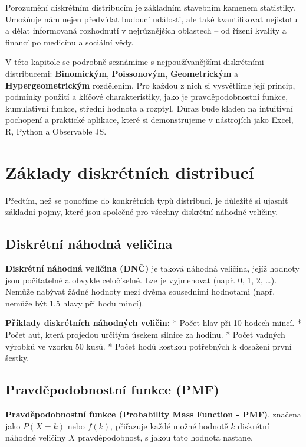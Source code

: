 \documentclass[
  czech,
  11pt,
  letterpaper,
  DIV=11,
  numbers=noendperiod]{scrreprt}
\begin{document}
Porozumění diskrétním distribucím je základním stavebním kamenem
statistiky. Umožňuje nám nejen předvídat budoucí události, ale také
kvantifikovat nejistotu a dělat informovaná rozhodnutí v nejrůznějších
oblastech -- od řízení kvality a financí po medicínu a sociální vědy.

V této kapitole se podrobně seznámíme s nejpoužívanějšími diskrétními
distribucemi: \textbf{Binomickým}, \textbf{Poissonovým},
\textbf{Geometrickým} a \textbf{Hypergeometrickým} rozdělením. Pro
každou z nich si vysvětlíme její princip, podmínky použití a klíčové
charakteristiky, jako je pravděpodobnostní funkce, kumulativní funkce,
střední hodnota a rozptyl. Důraz bude kladen na intuitivní pochopení a
praktické aplikace, které si demonstrujeme v nástrojích jako Excel, R,
Python a Observable JS.

\section{Základy diskrétních
distribucí}\label{zuxe1klady-diskruxe9tnuxedch-distribucuxed}

Předtím, než se ponoříme do konkrétních typů distribucí, je důležité si
ujasnit základní pojmy, které jsou společné pro všechny diskrétní
náhodné veličiny.

\subsection{Diskrétní náhodná
veličina}\label{diskruxe9tnuxed-nuxe1hodnuxe1-veliux10dina}

{\textbf{Diskrétní náhodná veličina (DNČ)}} je taková náhodná veličina,
jejíž hodnoty jsou počitatelné a obvykle celočíselné. Lze je vyjmenovat
(např. 0, 1, 2, \ldots). Nemůže nabývat žádné hodnoty mezi dvěma
sousedními hodnotami (např. nemůže být 1.5 hlavy při hodu mincí).

\textbf{Příklady diskrétních náhodných veličin:} * Počet hlav při 10
hodech mincí. * Počet aut, která projedou určitým úsekem silnice za
hodinu. * Počet vadných výrobků ve vzorku 50 kusů. * Počet hodů kostkou
potřebných k dosažení první šestky.

\subsection{Pravděpodobnostní funkce
(PMF)}\label{pravdux11bpodobnostnuxed-funkce-pmf}

{\textbf{Pravděpodobnostní funkce (Probability Mass Function - PMF)}},
značena jako \(P(X=k)\) nebo \(f(k)\), přiřazuje každé možné hodnotě
\(k\) diskrétní náhodné veličiny \(X\) pravděpodobnost, s jakou tato
hodnota nastane.
\end{document}
